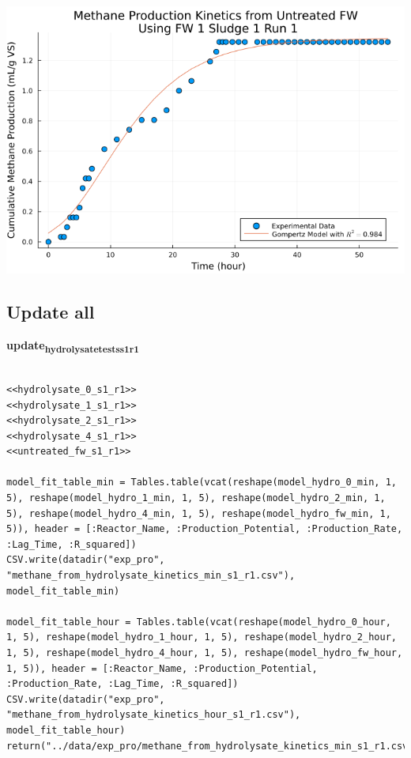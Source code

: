 \documentclass[11pt]{article}
\begin{document}
\begin{center}
\includegraphics[width=.9\linewidth]{../plots/BMPs/Untreated FW/specific_methane_kinetics_untreated_fw_s1_r1_hour.png}
\end{center}

\subsection{Update all}
\label{sec:org09b6514}

\textbf{update\textsubscript{hydrolysate}\textsubscript{tests}\textsubscript{s1}\textsubscript{r1}}
\begin{verbatim}

<<hydrolysate_0_s1_r1>>
<<hydrolysate_1_s1_r1>>
<<hydrolysate_2_s1_r1>>
<<hydrolysate_4_s1_r1>>
<<untreated_fw_s1_r1>>

model_fit_table_min = Tables.table(vcat(reshape(model_hydro_0_min, 1, 5), reshape(model_hydro_1_min, 1, 5), reshape(model_hydro_2_min, 1, 5), reshape(model_hydro_4_min, 1, 5), reshape(model_hydro_fw_min, 1, 5)), header = [:Reactor_Name, :Production_Potential, :Production_Rate, :Lag_Time, :R_squared])
CSV.write(datadir("exp_pro", "methane_from_hydrolysate_kinetics_min_s1_r1.csv"), model_fit_table_min)

model_fit_table_hour = Tables.table(vcat(reshape(model_hydro_0_hour, 1, 5), reshape(model_hydro_1_hour, 1, 5), reshape(model_hydro_2_hour, 1, 5), reshape(model_hydro_4_hour, 1, 5), reshape(model_hydro_fw_hour, 1, 5)), header = [:Reactor_Name, :Production_Potential, :Production_Rate, :Lag_Time, :R_squared])
CSV.write(datadir("exp_pro", "methane_from_hydrolysate_kinetics_hour_s1_r1.csv"), model_fit_table_hour)
return("../data/exp_pro/methane_from_hydrolysate_kinetics_min_s1_r1.csv")
\end{verbatim}
\end{document}
